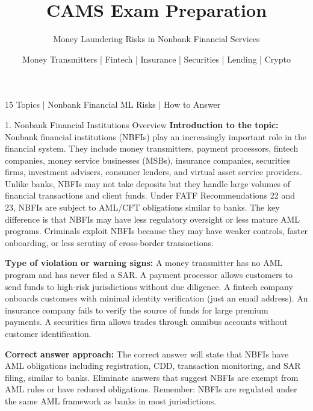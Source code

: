 \documentclass[11pt,a4paper]{beamer}
\title[CAMS Exam Preparation]{CAMS Exam Preparation}
\subtitle{Money Laundering Risks in Nonbank Financial Services}
\author{Money Transmitters | Fintech | Insurance | Securities | Lending | Crypto}
\date{}
\begin{document}
\begin{frame}
\titlepage
\centering
\tiny 15 Topics | Nonbank Financial ML Risks | How to Answer
\end{frame}

\begin{frame}{1. Nonbank Financial Institutions Overview}
\tiny
\noindent\textbf{Introduction to the topic:} Nonbank financial institutions (NBFIs) play an increasingly important role in the financial system. They include money transmitters, payment processors, fintech companies, money service businesses (MSBs), insurance companies, securities firms, investment advisers, consumer lenders, and virtual asset service providers. Unlike banks, NBFIs may not take deposits but they handle large volumes of financial transactions and client funds. Under FATF Recommendations 22 and 23, NBFIs are subject to AML/CFT obligations similar to banks. The key difference is that NBFIs may have less regulatory oversight or less mature AML programs. Criminals exploit NBFIs because they may have weaker controls, faster onboarding, or less scrutiny of cross-border transactions.

\vspace{0.1cm}
\noindent\textbf{Type of violation or warning signs:} A money transmitter has no AML program and has never filed a SAR. A payment processor allows customers to send funds to high-risk jurisdictions without due diligence. A fintech company onboards customers with minimal identity verification (just an email address). An insurance company fails to verify the source of funds for large premium payments. A securities firm allows trades through omnibus accounts without customer identification.

\vspace{0.1cm}
\noindent\textbf{Correct answer approach:} The correct answer will state that NBFIs have AML obligations including registration, CDD, transaction monitoring, and SAR filing, similar to banks. Eliminate answers that suggest NBFIs are exempt from AML rules or have reduced obligations. Remember: NBFIs are regulated under the same AML framework as banks in most jurisdictions.
\end{frame}
\end{document}
